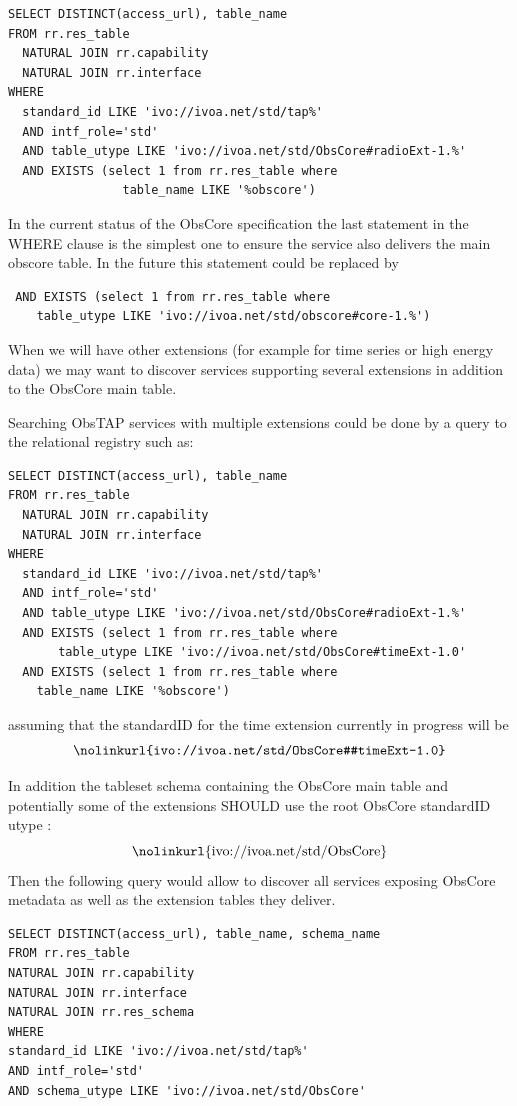 \documentclass[11pt,a4paper]{ivoa}
\begin{document}
\begin{lstlisting}
SELECT DISTINCT(access_url), table_name
FROM rr.res_table
  NATURAL JOIN rr.capability
  NATURAL JOIN rr.interface
WHERE
  standard_id LIKE 'ivo://ivoa.net/std/tap%'
  AND intf_role='std'
  AND table_utype LIKE 'ivo://ivoa.net/std/ObsCore#radioExt-1.%'
  AND EXISTS (select 1 from rr.res_table where
    			table_name LIKE '%obscore')
\end{lstlisting}

In the current status of the ObsCore specification the last statement in the WHERE clause
is the simplest one to ensure the service also delivers the main obscore table. 
In the future  this statement could be replaced   by 
\begin{lstlisting}
 AND EXISTS (select 1 from rr.res_table where
    table_utype LIKE 'ivo://ivoa.net/std/obscore#core-1.%')
\end{lstlisting}
 
When we will have other extensions (for example for time series or high energy data) we may want to 
discover services  supporting  several extensions in addition to the ObsCore 
main table.

Searching ObsTAP services with multiple extensions could be done by a query to the relational registry  such as:  

\begin{lstlisting}
SELECT DISTINCT(access_url), table_name
FROM rr.res_table
  NATURAL JOIN rr.capability
  NATURAL JOIN rr.interface
WHERE
  standard_id LIKE 'ivo://ivoa.net/std/tap%'
  AND intf_role='std'
  AND table_utype LIKE 'ivo://ivoa.net/std/ObsCore#radioExt-1.%'
  AND EXISTS (select 1 from rr.res_table where 
       table_utype LIKE 'ivo://ivoa.net/std/ObsCore#timeExt-1.0'
  AND EXISTS (select 1 from rr.res_table where
    table_name LIKE '%obscore')
\end{lstlisting}

assuming that the standardID for the time extension currently in progress will be 
$$
\hbox{\nolinkurl{ivo://ivoa.net/std/ObsCore#timeExt-1.0}}
$$

In addition the tableset schema containing the ObsCore main table and potentially some of the  extensions
SHOULD use the root ObsCore standardID utype :
$$
\hbox{\nolinkurl{ivo://ivoa.net/std/ObsCore}}
$$
Then the following query would allow to discover all services exposing ObsCore metadata as well as  the extension tables they deliver.

\begin{lstlisting}
SELECT DISTINCT(access_url), table_name, schema_name
FROM rr.res_table
NATURAL JOIN rr.capability
NATURAL JOIN rr.interface
NATURAL JOIN rr.res_schema
WHERE
standard_id LIKE 'ivo://ivoa.net/std/tap%'
AND intf_role='std'
AND schema_utype LIKE 'ivo://ivoa.net/std/ObsCore'
\end{lstlisting}

\newpage
\appendix





\end{document}
